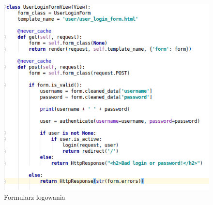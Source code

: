 \documentclass[12pt]{article}
\begin{document}
	\begin{figure}[H]
		\centering
		\includegraphics[scale=0.7]{img/c_user_login.png}
		\caption{Formularz logowania}
	\end{figure}
	\newpage
\end{document}
